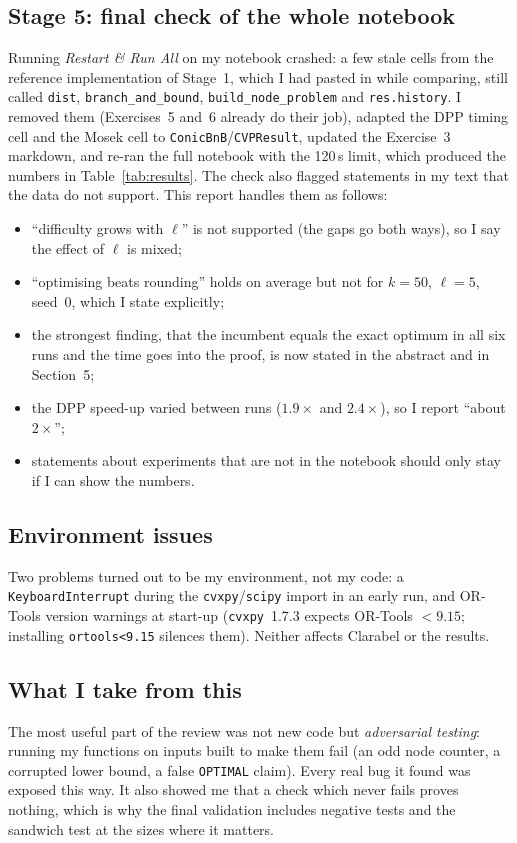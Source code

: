 \documentclass[11pt,a4paper]{article}
\begin{document}
\subsection{Stage 5: final check of the whole notebook}

Running \emph{Restart \& Run All} on my notebook crashed: a few stale cells from the reference implementation of Stage~1, which I had pasted in while comparing, still called \texttt{dist}, \texttt{branch\_and\_bound}, \texttt{build\_node\_problem} and \texttt{res.history}. I removed them (Exercises~5 and~6 already do their job), adapted the DPP timing cell and the Mosek cell to \texttt{ConicBnB}/\texttt{CVPResult}, updated the Exercise~3 markdown, and re-ran the full notebook with the 120\,s limit, which produced the numbers in Table~\ref{tab:results}. The check also flagged statements in my text that the data do not support. This report handles them as follows:
\begin{itemize}
  \item ``difficulty grows with $\ell$'' is not supported (the gaps go both ways), so I say the effect of $\ell$ is mixed;
  \item ``optimising beats rounding'' holds on average but not for $k=50$, $\ell=5$, seed~0, which I state explicitly;
  \item the strongest finding, that the incumbent equals the exact optimum in all six runs and the time goes into the proof, is now stated in the abstract and in Section~5;
  \item the DPP speed-up varied between runs ($1.9\times$ and $2.4\times$), so I report ``about $2\times$'';
  \item statements about experiments that are not in the notebook should only stay if I can show the numbers.
\end{itemize}

\subsection{Environment issues}

Two problems turned out to be my environment, not my code: a \texttt{KeyboardInterrupt} during the \texttt{cvxpy}/\texttt{scipy} import in an early run, and OR-Tools version warnings at start-up (\texttt{cvxpy}~1.7.3 expects OR-Tools $<9.15$; installing \texttt{ortools<9.15} silences them). Neither affects Clarabel or the results.

\subsection{What I take from this}

The most useful part of the review was not new code but \emph{adversarial testing}: running my functions on inputs built to make them fail (an odd node counter, a corrupted lower bound, a false \texttt{OPTIMAL} claim). Every real bug it found was exposed this way. It also showed me that a check which never fails proves nothing, which is why the final validation includes negative tests and the sandwich test at the sizes where it matters.
\end{document}
